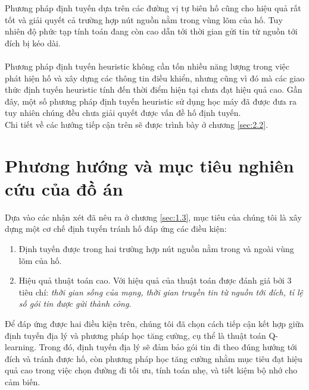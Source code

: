\documentclass[12pt]{report}
\begin{document}
Phương pháp định tuyến dựa trên các đường vị tự biên hố cũng cho hiệu quả rất tốt và giải quyết cả trường hợp nút nguồn nằm trong vùng lõm của hố. Tuy nhiên độ phức tạp tính toán đang còn cao dẫn tới thời gian gửi tin từ nguồn tới đích bị kéo dài.\\ \\
Phương pháp định tuyến heuristic không cần tốn nhiều năng lượng trong việc phát hiện hố và xây dựng các thông tin điều khiển, nhưng cũng vì đó mà các giao thức định tuyến heuristic tính đến thời điểm hiện tại chưa đạt hiệu quả cao. Gần đây, một số phương pháp định tuyến heuristic sử dụng học máy đã được đưa ra tuy nhiên chúng đều chưa giải quyết được vấn đề hố định tuyến.\\
Chi tiết về các hướng tiếp cận trên sẽ được trình bày ở chương \ref{sec:2.2}.

\section{Phương hướng và mục tiêu nghiên cứu của đồ án}
\label{sec:1.4}
Dựa vào các nhận xét đã nêu ra ở chương \ref{sec:1.3}, mục tiêu của chúng tôi là xây dựng một cơ chế định tuyến tránh hố đáp ứng các điều kiện:
\begin{enumerate}
\item Định tuyến được trong hai trường hợp nút nguồn nằm trong và ngoài vùng lõm của hố.
\item Hiệu quả thuật toán cao. Với hiệu quả của thuật toán được đánh giá bởi 3 tiêu chí: \textit{thời gian sống của mạng, thời gian truyền tin từ nguồn tới đích, tỉ lệ số gói tin được gửi thành công}.
\end{enumerate}
Để đáp ứng được hai điều kiện trên, chúng tôi đã chọn cách tiếp cận kết hợp giữa định tuyến địa lý và phương pháp học tăng cường, cụ thể là thuật toán Q-learning. Trong đó, định tuyến địa lý sẽ đảm bảo gói tin đi theo đúng hướng tới đích và tránh được hố, còn phương pháp học tăng cường nhằm mục tiêu đạt hiệu quả cao trong việc chọn đường đi tối ưu, tính toán nhẹ, và tiết kiệm bộ nhớ cho cảm biến.
\end{document}
